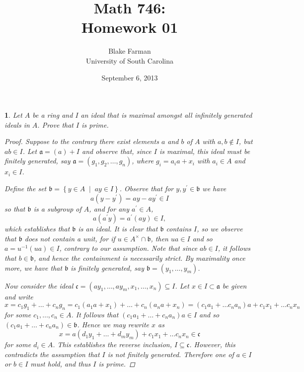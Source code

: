 \documentclass[10pt]{amsart}
\author{Blake Farman\\University of South Carolina}
\title{Math 746:\\Homework 01}
\date{September 6, 2013}
\begin{document}
\maketitle

\providecommand{\p}{\mathfrak{p}}
\providecommand{\m}{\mathfrak{m}}

\newtheorem{thm}{}
\newtheorem{lem}{Lemma}

\begin{thm}
  Let $A$ be a ring and $I$ an ideal that is maximal amongst all infinitely generated ideals in $A$.  Prove that $I$ is prime.
  
  \begin{proof}
    Suppose to the contrary there exist elements $a$ and $b$ of $A$ with $a,b \not \in I$, but $ab \in I$.
    Let $\mathfrak{a} = (a) + I$ and observe that, since $I$ is maximal, this ideal must be finitely generated, say $\mathfrak{a} = (g_1, g_2, \ldots, g_n)$, where $g_i = a_ia + x_i$ with $a_i \in A$ and $x_i \in I$.
    
    Define the set $\mathfrak{b} = \left\{y \in A \;\middle\vert\; ay \in I \right\}$.
    Observe that for $y, y^\prime \in \mathfrak{b}$ we have 
    $$a(y - y^\prime) = ay - ay^\prime \in I$$ 
    so that $\mathfrak{b}$ is a subgroup of $A$, and for any $a^\prime \in A$, 
    $$a(a^\prime y) = a^\prime(ay) \in I,$$
    which establishes that $\mathfrak{b}$ is an ideal.
    It is clear that $\mathfrak{b}$ contains $I$, so we observe that $\mathfrak{b}$ does not contain a unit, for if $u \in A^\times \cap \mathfrak{b}$, then $ua \in I$ and so $a = u^{-1}(ua) \in I$, contrary to our assumption.
    Note that since $ab \in I$, it follows that $b \in \mathfrak{b}$, and hence the containment is necessarily strict.
    By maximality once more, we have that $\mathfrak{b}$ is finitely generated, say $\mathfrak{b} = (y_1, \ldots, y_m)$.
    
    Now consider the ideal $\mathfrak{c} = (ay_1, \ldots, ay_m, x_1, \ldots, x_n) \subseteq I$.
    Let $x \in I \subset \mathfrak{a}$ be given and write 
    $$x = c_1g_1 + \ldots + c_ng_n  = c_1(a_1a + x_1) + \ldots + c_n(a_na + x_n) = (c_1a_1 + \ldots c_na_n)a + c_1x_1 + \ldots c_nx_n$$%
    for some $c_1, \ldots, c_n \in A$.
    It follows that $(c_1a_1 + \ldots + c_na_n)a \in I$ and so $(c_1a_1 + \ldots + c_na_n) \in \mathfrak{b}$.
    Hence we may rewrite $x$ as 
    $$x = a(d_1y_1 + \ldots + d_my_m) + c_1x_1 + \ldots c_nx_n \in \mathfrak{c}$$
    for some $d_i \in A$.
    This establishes the reverse inclusion, $I \subseteq \mathfrak{c}$.
    However, this contradicts the assumption that $I$ is not finitely generated.
    Therefore one of $a \in I$ or $b \in I$ must hold, and thus $I$ is prime.
  \end{proof}
\end{thm}
\end{document}
